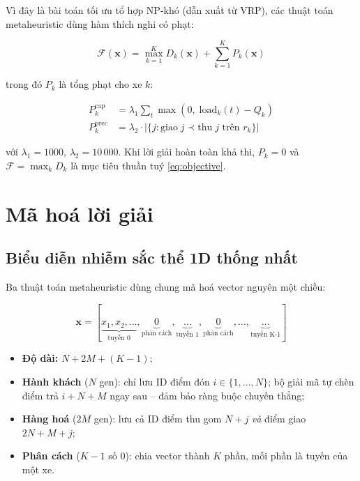 \documentclass[12pt, a4paper]{article}
\newcommand{\fitfunc}{\mathcal{F}}
\begin{document}
Vì đây là bài toán tối ưu tổ hợp NP-khó (dẫn xuất từ VRP), các thuật toán metaheuristic dùng hàm thích nghi có phạt:

\begin{equation}
  \fitfunc(\mathbf{x}) = \max_{k=1}^{K} D_k(\mathbf{x}) + \sum_{k=1}^{K} P_k(\mathbf{x})
  \label{eq:fitness}
\end{equation}

trong đó $P_k$ là tổng phạt cho xe $k$:

\begin{align}
  P_k^{\text{cap}}  &= \lambda_1 \sum_{t} \max(0,\; \text{load}_k(t) - Q_k) \\
  P_k^{\text{prec}} &= \lambda_2 \cdot |\{j : \text{giao}\;j \prec \text{thu}\;j \text{ trên } r_k\}|
\end{align}

với $\lambda_1 = 1000$, $\lambda_2 = 10\,000$. Khi lời giải hoàn toàn khả thi, $P_k = 0$ và $\fitfunc = \max_k D_k$ là mục tiêu thuần tuý \eqref{eq:objective}.

\section{Mã hoá lời giải}

\subsection{Biểu diễn nhiễm sắc thể 1D thống nhất}

Ba thuật toán metaheuristic dùng chung mã hoá vector nguyên một chiều:

\begin{equation}
  \mathbf{x} = [\underbrace{x_1, x_2, \ldots}_{\text{tuyến 0}},
                \underbrace{0}_{\text{phân cách}},
                \underbrace{\ldots}_{\text{tuyến 1}},
                \underbrace{0}_{\text{phân cách}},
                \ldots,
                \underbrace{\ldots}_{\text{tuyến K-1}}]
\end{equation}

\begin{itemize}[noitemsep]
  \item \textbf{Độ dài:} $N + 2M + (K-1)$;
  \item \textbf{Hành khách} ($N$ gen): chỉ lưu ID điểm đón $i \in \{1,\ldots,N\}$; bộ giải mã tự chèn điểm trả $i+N+M$ ngay sau -- đảm bảo ràng buộc chuyến thẳng;
  \item \textbf{Hàng hoá} ($2M$ gen): lưu cả ID điểm thu gom $N+j$ \emph{và} điểm giao $2N+M+j$;
  \item \textbf{Phân cách} ($K-1$ số 0): chia vector thành $K$ phần, mỗi phần là tuyến của một xe.
\end{itemize}
\end{document}
